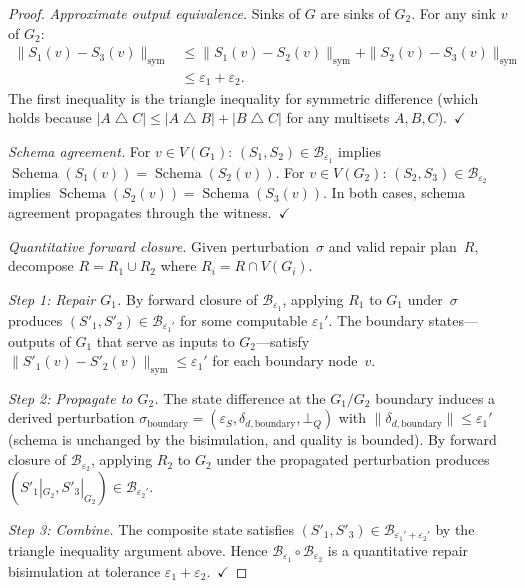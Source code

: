 \documentclass[11pt,a4paper]{article}
\theoremstyle{definition}
\newcommand{\epsS}{\varepsilon_S}
\newcommand{\botQ}{\bot_Q}
\DeclareMathOperator{\Schema}{Schema}
\begin{document}
\begin{proof}
\emph{Approximate output equivalence.}
Sinks of $G$ are sinks of $G_2$.  For any sink $v$ of $G_2$:
\begin{align*}
  \|S_1(v) - S_3(v)\|_{\mathrm{sym}}
  &\leq \|S_1(v) - S_2(v)\|_{\mathrm{sym}}
    + \|S_2(v) - S_3(v)\|_{\mathrm{sym}} \\
  &\leq \varepsilon_1 + \varepsilon_2.
\end{align*}
The first inequality is the triangle inequality for symmetric difference
(which holds because $|A \mathbin{\triangle} C| \leq
|A \mathbin{\triangle} B| + |B \mathbin{\triangle} C|$
for any multisets $A, B, C$).~$\checkmark$

\emph{Schema agreement.}
For $v \in V(G_1)$: $(S_1, S_2) \in \mathcal{B}_{\varepsilon_1}$ implies
$\Schema(S_1(v)) = \Schema(S_2(v))$.
For $v \in V(G_2)$: $(S_2, S_3) \in \mathcal{B}_{\varepsilon_2}$ implies
$\Schema(S_2(v)) = \Schema(S_3(v))$.
In both cases, schema agreement propagates through the witness.~$\checkmark$

\emph{Quantitative forward closure.}
Given perturbation~$\sigma$ and valid repair plan~$R$, decompose
$R = R_1 \cup R_2$ where $R_i = R \cap V(G_i)$.

\emph{Step 1: Repair $G_1$.}
By forward closure of $\mathcal{B}_{\varepsilon_1}$, applying $R_1$ to $G_1$
under~$\sigma$ produces
$(S'_1, S'_2) \in \mathcal{B}_{\varepsilon_1'}$ for some computable
$\varepsilon_1'$.  The boundary states---outputs of $G_1$ that serve as inputs
to $G_2$---satisfy
$\|S'_1(v) - S'_2(v)\|_{\mathrm{sym}} \leq \varepsilon_1'$
for each boundary node~$v$.

\emph{Step 2: Propagate to $G_2$.}
The state difference at the $G_1/G_2$ boundary induces a derived perturbation
$\sigma_{\mathrm{boundary}} = (\epsS, \delta_{d,\mathrm{boundary}}, \botQ)$
with $\|\delta_{d,\mathrm{boundary}}\| \leq \varepsilon_1'$ (schema is
unchanged by the bisimulation, and quality is bounded).
By forward closure of $\mathcal{B}_{\varepsilon_2}$, applying $R_2$ to $G_2$
under the propagated perturbation produces
$(S'_1|_{G_2}, S'_3|_{G_2}) \in \mathcal{B}_{\varepsilon_2'}$.

\emph{Step 3: Combine.}
The composite state satisfies
$(S'_1, S'_3) \in \mathcal{B}_{\varepsilon_1' + \varepsilon_2'}$
by the triangle inequality argument above.
Hence $\mathcal{B}_{\varepsilon_1} \circ \mathcal{B}_{\varepsilon_2}$
is a quantitative repair bisimulation at tolerance
$\varepsilon_1 + \varepsilon_2$.~$\checkmark$
\end{proof}
\end{document}
